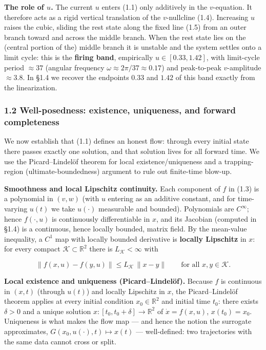\documentclass[
  11pt,
]{article}
\providecommand{\lt}{<}
\providecommand{\gt}{>}
\begin{document}
\textbf{The role of \(u\).} The current \(u\) enters (1.1) only
additively in the \(v\)-equation. It therefore acts as a rigid vertical
translation of the \(v\)-nullcline (1.4). Increasing \(u\) raises the
cubic, sliding the rest state along the fixed line (1.5) from an outer
branch toward and across the middle branch. When the rest state lies on
the (central portion of the) middle branch it is unstable and the system
settles onto a limit cycle: this is the \textbf{firing band},
empirically \(u\in[0.33,1.42]\), with limit-cycle period \(\approx 37\)
(angular frequency \(\omega\approx 2\pi/37\approx 0.17\)) and
peak-to-peak \(v\)-amplitude \(\approx 3.8\). In §1.4 we recover the
endpoints \(0.33\) and \(1.42\) of this band exactly from the
linearization.

\subsubsection{1.2 Well-posedness: existence, uniqueness, and forward
completeness}\label{well-posedness-existence-uniqueness-and-forward-completeness}

We now establish that (1.1) defines an honest flow: through every
initial state there passes exactly one solution, and that solution lives
for all forward time. We use the Picard--Lindelöf theorem for local
existence/uniqueness and a trapping-region (ultimate-boundedness)
argument to rule out finite-time blow-up.

\textbf{Smoothness and local Lipschitz continuity.} Each component of
\(f\) in (1.3) is a polynomial in \((v,w)\) (with \(u\) entering as an
additive constant, and for time-varying \(u(t)\) we take \(u(\cdot)\)
measurable and bounded). Polynomials are \(C^\infty\); hence
\(f(\cdot,u)\) is continuously differentiable in \(x\), and its Jacobian
(computed in §1.4) is a continuous, hence locally bounded, matrix field.
By the mean-value inequality, a \(C^1\) map with locally bounded
derivative is \textbf{locally Lipschitz} in \(x\): for every compact
\(\mathcal K\subset\mathbb{R}^2\) there is \(L_{\mathcal K}\lt \infty\)
with

\[
\|f(x,u)-f(y,u)\|\le L_{\mathcal K}\,\|x-y\|
\qquad\text{for all }x,y\in\mathcal K.
\tag{1.6}
\]

\textbf{Local existence and uniqueness (Picard--Lindelöf).} Because
\(f\) is continuous in \((x,t)\) (through \(u(t)\)) and locally
Lipschitz in \(x\), the Picard--Lindelöf theorem applies at every
initial condition \(x_0\in\mathbb{R}^2\) and initial time \(t_0\): there
exists \(\delta\gt 0\) and a unique solution
\(x:[t_0,t_0+\delta]\to\mathbb{R}^2\) of \(\dot x=f(x,u)\),
\(x(t_0)=x_0\). Uniqueness is what makes the flow map --- and hence the
notion the surrogate approximates, \(G(x_0,u(\cdot),t)\mapsto x(t)\) ---
well-defined: two trajectories with the same data cannot cross or split.
\end{document}
